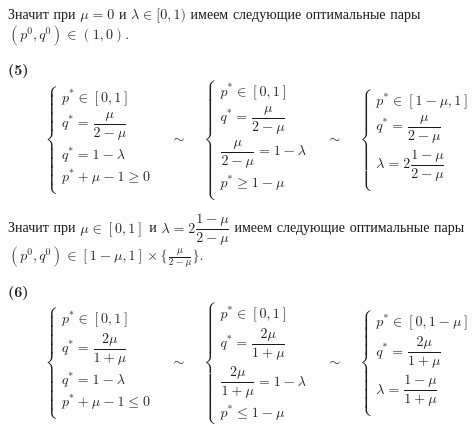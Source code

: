 Значит при $\mu=0$ и $\lambda \in [0, 1)$ имеем следующие оптимальные пары
$ (p^0, q^0) \in (1, 0)$.

\hspace{5mm}

\textbf{(5)}
$$
	\begin{cases}
		p^* \in [0, 1] \\
		q^* = \dfrac{\mu}{2-\mu} \\
		q^* = 1 - \lambda \\
		p^* + \mu - 1 \geqslant 0 \\
	\end{cases}
	\quad \sim \quad
	\begin{cases}
		p^* \in [0, 1] \\
		q^* = \dfrac{\mu}{2-\mu} \\
		\dfrac{\mu}{2-\mu} = 1 - \lambda \\
		p^* \geqslant 1 - \mu \\
	\end{cases}
	\quad \sim \quad
	\begin{cases}
		p^* \in [1 - \mu, 1] \\
		q^* = \dfrac{\mu}{2-\mu} \\
		\lambda = 2\dfrac{1-\mu}{2-\mu} \\
	\end{cases}
$$

Значит при $\mu \in [0, 1]$ и $\lambda = 2\dfrac{1 - \mu}{2 - \mu}$ 
имеем следующие оптимальные пары
$ (p^0, q^0) \in [1 - \mu, 1] \times  \{ \frac{\mu}{2 - \mu}\}$.

\hspace{5mm}

\textbf{(6)}
$$
	\begin{cases}
		p^* \in [0, 1] \\
		q^*= \dfrac{2\mu}{1+\mu} \\
		q^* = 1 - \lambda \\
		p^* + \mu - 1 \leqslant 0 \\
	\end{cases}
	\quad \sim \quad
	\begin{cases}
		p^* \in [0, 1] \\
		q^* = \dfrac{2\mu}{1+\mu} \\
		\dfrac{2\mu}{1+\mu} = 1 - \lambda \\
		p^* \leqslant 1 - \mu 
	\end{cases}
	\quad \sim \quad
	\begin{cases}
		p^* \in [0, 1 - \mu] \\
		q^* = \dfrac{2\mu}{1+\mu} \\
		\lambda = \dfrac{1-\mu}{1+\mu} \\
	\end{cases}
$$

